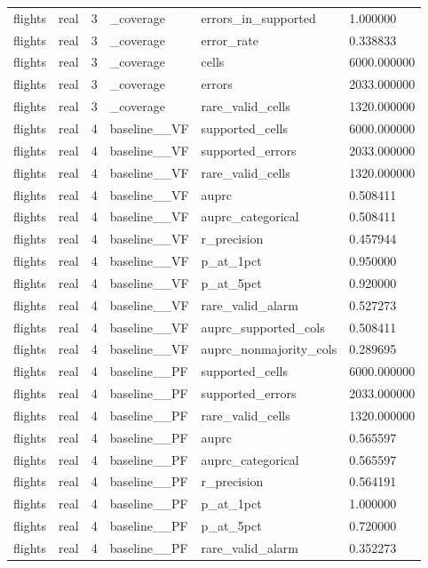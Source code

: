 \begin{tabular}{llllll}
flights & real & 3 & \_coverage & errors\_in\_supported & 1.000000 \\
flights & real & 3 & \_coverage & error\_rate & 0.338833 \\
flights & real & 3 & \_coverage & cells & 6000.000000 \\
flights & real & 3 & \_coverage & errors & 2033.000000 \\
flights & real & 3 & \_coverage & rare\_valid\_cells & 1320.000000 \\
flights & real & 4 & baseline\_\_VF & supported\_cells & 6000.000000 \\
flights & real & 4 & baseline\_\_VF & supported\_errors & 2033.000000 \\
flights & real & 4 & baseline\_\_VF & rare\_valid\_cells & 1320.000000 \\
flights & real & 4 & baseline\_\_VF & auprc & 0.508411 \\
flights & real & 4 & baseline\_\_VF & auprc\_categorical & 0.508411 \\
flights & real & 4 & baseline\_\_VF & r\_precision & 0.457944 \\
flights & real & 4 & baseline\_\_VF & p\_at\_1pct & 0.950000 \\
flights & real & 4 & baseline\_\_VF & p\_at\_5pct & 0.920000 \\
flights & real & 4 & baseline\_\_VF & rare\_valid\_alarm & 0.527273 \\
flights & real & 4 & baseline\_\_VF & auprc\_supported\_cols & 0.508411 \\
flights & real & 4 & baseline\_\_VF & auprc\_nonmajority\_cols & 0.289695 \\
flights & real & 4 & baseline\_\_PF & supported\_cells & 6000.000000 \\
flights & real & 4 & baseline\_\_PF & supported\_errors & 2033.000000 \\
flights & real & 4 & baseline\_\_PF & rare\_valid\_cells & 1320.000000 \\
flights & real & 4 & baseline\_\_PF & auprc & 0.565597 \\
flights & real & 4 & baseline\_\_PF & auprc\_categorical & 0.565597 \\
flights & real & 4 & baseline\_\_PF & r\_precision & 0.564191 \\
flights & real & 4 & baseline\_\_PF & p\_at\_1pct & 1.000000 \\
flights & real & 4 & baseline\_\_PF & p\_at\_5pct & 0.720000 \\
flights & real & 4 & baseline\_\_PF & rare\_valid\_alarm & 0.352273 \\

\end{tabular}
